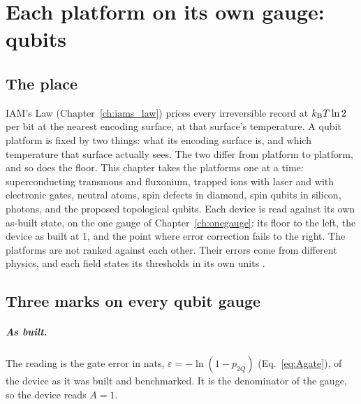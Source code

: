 \chapter{Each platform on its own gauge: qubits}\label{ch:qplatforms}

\section*{The place}
IAM's Law (Chapter~\ref{ch:iams_law}) prices every irreversible record at $k_{\mathrm B} T\ln2$ per bit at the nearest encoding surface, at that
surface's temperature. A qubit platform is fixed by two things: what its encoding surface is, and which temperature that surface
actually sees. The two differ from platform to platform, and so does the floor. This chapter takes the platforms one at a time:
superconducting transmons and fluxonium, trapped ions with laser and with electronic gates, neutral atoms, spin defects in diamond,
spin qubits in silicon, photons, and the proposed topological qubits. Each device is read against its own as-built state, on the
one gauge of Chapter~\ref{ch:onegauge}: its floor to the left, the device as built at 1, and the point where error correction fails
to the right. The platforms are not ranked against each other. Their errors come from different physics, and each field states its
thresholds in its own units \interp.

\section{Three marks on every qubit gauge}\label{sec:qp_marks}
\paragraph{As built.} The reading is the gate error in nats, $\varepsilon=-\ln(1-p_{2Q})$ (Eq.~\eqref{eq:Agate}), of the device as
it was built and benchmarked. It is the denominator of the gauge, so the device reads $A=1$.

